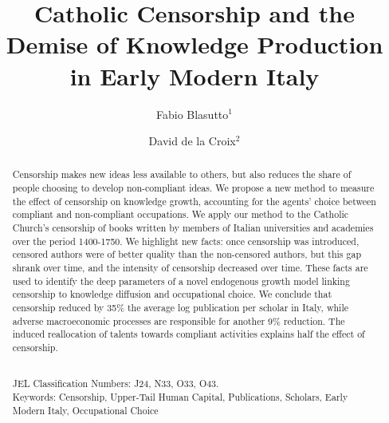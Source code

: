 \documentclass[12pt]{article}
\title{Catholic Censorship and the Demise of Knowledge Production in Early Modern Italy}
\author{Fabio Blasutto$^1$ \and David de la Croix$^2$}
\begin{document}
\maketitle


\begin{abstract}
Censorship makes new ideas less available to others, but also reduces the share of people choosing to develop non-compliant ideas.
We propose a new method to measure the effect of censorship on knowledge growth,  accounting for the agents' choice between compliant and non-compliant occupations. We apply our method to the Catholic Church's censorship of books written by members of Italian universities and academies over the period 1400-1750. We highlight  new facts: once censorship was introduced, censored authors were of better quality than the non-censored authors, but this gap shrank over time, and the intensity of censorship decreased over time. These facts are used to identify the deep parameters of a novel endogenous growth model linking censorship to knowledge diffusion and occupational choice. We conclude that censorship reduced by 35\% the average log publication per scholar in Italy, while adverse macroeconomic processes are responsible for another 9\% reduction. The induced reallocation of talents towards compliant activities explains half the effect of censorship.

\mbox{ }\\
JEL Classification Numbers: J24, N33, O33, O43. \\
Keywords: Censorship, Upper-Tail Human Capital, Publications, Scholars, Early Modern Italy, Occupational Choice
\end{abstract}


\thispagestyle{empty}
\newpage
\onehalfspacing










\end{document}
